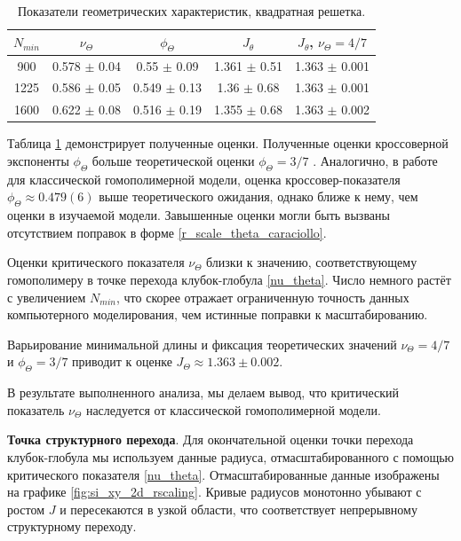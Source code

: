  \begin{table}[ht!]
	\caption{Показатели геометрических характеристик, квадратная решетка.}
	\centering
	\begin{tabular}{ccccc}
		$N_{min}$ & $\nu_{\Theta}$ &  $\phi_{\Theta}$ & $ J_{\theta}$  & $  J_{\theta}$, $\nu_{\Theta} = 4/7$   \\ \hline
		
		
		900 & 0.578 $\pm$ 0.04 & 0.55 $\pm$ 0.09 & 1.361 $\pm$ 0.51 & 1.363 $\pm$ 0.001 \\
		1225 & 0.586 $\pm$ 0.05 & 0.549 $\pm$ 0.13 & 1.36 $\pm$ 0.68 & 1.363 $\pm$ 0.001 \\
		1600 & 0.622 $\pm$ 0.08 & 0.516 $\pm$ 0.19 & 1.355 $\pm$ 0.68 & 1.363 $\pm$ 0.002 
	\end{tabular}
	\label{table:estimate2d}
\end{table} 

Таблица \ref{table:estimate2d} демонстрирует полученные оценки. 
Полученные оценки кроссоверной экспоненты $\phi_{\Theta}$ больше теоретической оценки $\phi_{\Theta} = 3/7$   \cite{PhysRevLett.59.539}.  
Аналогично, в работе \cite{Caracciolo_2011}  для классической гомополимерной модели, оценка кроссовер-показателя $\phi_{\Theta}  \approx 0.479(6) $  выше теоретического ожидания, однако ближе к нему, чем оценки в изучаемой модели.  
Завышенные оценки могли быть вызваны отсутствием поправок в форме \eqref{r_scale_theta_caraciollo}. 

Оценки критического показателя $\nu_{\Theta} $ близки к значению, соответствующему гомополимеру в точке перехода клубок-глобула \eqref{nu_theta}. Число немного растёт с увеличением $N_{min}$, что скорее отражает ограниченную точность данных компьютерного моделирования, чем истинные поправки к масштабированию. 

Варьирование минимальной длины и фиксация теоретических значений $\nu_{\Theta} = 4/7$ и  $\phi_{\Theta} = 3/7$ приводит к оценке  $J_{\Theta} \approx 1.363 \pm 0.002 $. 

В результате выполненного анализа, мы делаем вывод, что критический показатель $\nu_{\Theta}$ наследуется от классической гомополимерной модели. 

\textbf{Точка структурного перехода}.  
Для окончательной оценки точки перехода клубок-глобула мы используем данные  радиуса, отмасштабированного с помощью критического показателя  \eqref{nu_theta}. 
Отмасштабированные данные изображены на графике  \ref{fig:si_xy_2d_rscaling}. Кривые радиусов монотонно убывают с ростом $J$ и пересекаются в узкой области, что соответствует непрерывному структурному переходу.


